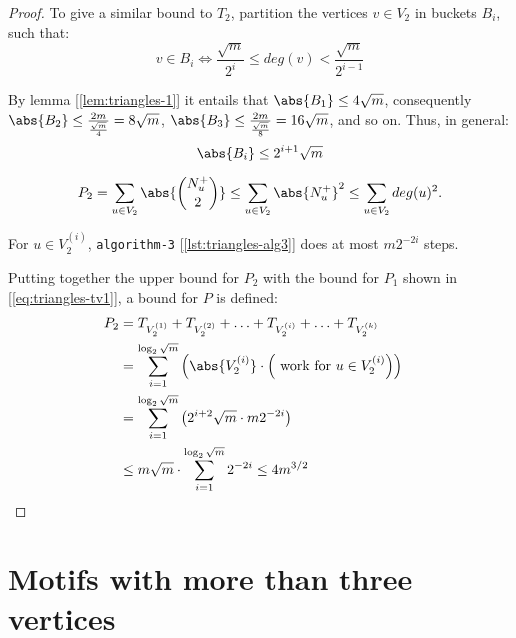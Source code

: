 \begin{proof}

    To give a similar bound to $T_2$, partition the vertices $v \in V_2$ in buckets $B_i$, such that:
    \[
        v \in B_i \iff \frac{\sqrt{m}}{2^i} \leq deg(v) < \frac{\sqrt{m}}{2^{i - 1}}
    \]

    By lemma [\ref{lem:triangles-1}] it entails that $\abs{B_1} \leq 4 \sqrt{m}$, consequently $\abs{B_2} \leq \frac{2 m}{\frac{\sqrt{m}}{4}} = 8 \sqrt{m}$, $\abs{B_3} \leq \frac{2 m}{\frac{\sqrt{m}}{8}} = 16 \sqrt{m}$, and so on. Thus, in general:
    \begin{equation}\label{lem:triangles-2}
        \abs{B_i} \leq 2^{i + 1} \sqrt{m}
    \end{equation}

    \begin{lemma}\label{lem:triangles-3}
        \begin{equation}\label{eq:triangles-tv2}
            P_2 = \sum_{u \in V_2} \abs{\binom{N_u^+}{2}} \leq \sum_{u \in V_2} \abs{N_u^+}^2 \leq \sum_{u \in V_2} deg(u)^2.
        \end{equation}
    \end{lemma}

    \begin{lemma}\label{lem:triangles-4}
        For $u \in V_2^{(i)}$, \texttt{algorithm-3} [\ref{lst:triangles-alg3}] does at most $m 2^{-2i}$ steps.
    \end{lemma}

    Putting together the upper bound for $P_2$ with the bound for $P_1$ shown in [\ref{eq:triangles-tv1}], a bound for $P$ is defined:
    \begin{align*}
        P_2 &= T_{V_2^{(1)}} + T_{V_2^{(2)}} + \ldots + T_{V_2^{(i)}} + \ldots + T_{V_2^{(k)}} & \\
        &= \sum_{i=1}^{\log_2 \sqrt{m}} \left( \abs{V_2^{(i)}} \cdot \left(\text{ work for } u \in V_2^{(i)} \right) \right) & \\
        &= \sum_{i=1}^{\log_2 \sqrt{m}} \left( 2^{i+2} \sqrt{m} \cdot m2^{-2i} \right) & \\
        &\leq m \sqrt{m} \cdot \sum_{i=1}^{\log_2 \sqrt{m}} 2^{-2i} \leq 4 m^{3/2} &
    \end{align*}
\end{proof}


\section{Motifs with more than three vertices}\label{sec:big-motifs}

